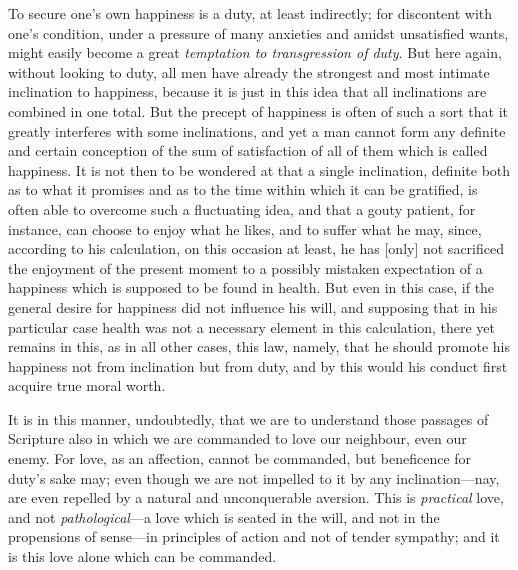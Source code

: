 To secure one's own happiness is a duty, at least indirectly; for
discontent with one's condition, under a pressure of many anxieties
and amidst unsatisfied wants, might easily become a great
\textit{temptation to transgression of duty}. But here again, without
looking to duty, all men have already the strongest and most intimate
inclination to happiness, because it is just in this idea that all
inclinations are combined in one total. But the precept of happiness
is often of such a sort that it greatly interferes with some
inclinations, and yet a man cannot form any definite and certain
conception of the sum of satisfaction of all of them which is called
happiness. It is not then to be wondered at that a single inclination,
definite both as to what it promises and as to the time within which
it can be gratified, is often able to overcome such a fluctuating
idea, and that a gouty patient, for instance, can choose to enjoy what
he likes, and to suffer what he may, since, according to his
calculation, on this occasion at least, he has [only] not sacrificed
the enjoyment of the present moment to a possibly mistaken expectation
of a happiness which is supposed to be found in health. But even in
this case, if the general desire for happiness did not influence his
will, and supposing that in his particular case health was not a
necessary element in this calculation, there yet remains in this, as
in all other cases, this law, namely, that he should promote his
happiness not from inclination but from duty, and by this would his
conduct first acquire true moral worth.

It is in this manner, undoubtedly, that we are to understand those
passages of Scripture also in which we are commanded to love our
neighbour, even our enemy. For love, as an affection, cannot be
commanded, but beneficence for duty's sake may; even though we are not
impelled to it by any inclination---nay, are even repelled by a
natural and unconquerable aversion. This is \textit{practical} love,
and not \textit{pathological}---a love which is seated in 
the will, and not in the propensions of sense---in principles of
action and not of tender sympathy; and it is this love alone which can
be commanded.

